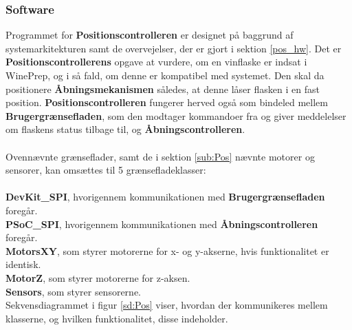\subsubsection{Software}
Programmet for \textbf{Positionscontrolleren} er designet på baggrund af systemarkitekturen samt de overvejelser, der er gjort i sektion \ref{pos_hw}. Det er \textbf{Positionscontrollerens} opgave at vurdere, om en vinflaske er indsat i WinePrep, og i så fald, om denne er kompatibel med systemet. Den skal da positionere \textbf{Åbningsmekanismen} således, at denne låser flasken i en fast position. \textbf{Positionscontrolleren} fungerer herved også som bindeled mellem \textbf{Brugergrænsefladen}, som den modtager kommandoer fra og giver meddelelser om flaskens status tilbage til, og \textbf{Åbningscontrolleren}. \\
\\
Ovennævnte grænseflader, samt de i sektion \ref{sub:Pos} nævnte motorer og sensorer, kan omsættes til 5 grænsefladeklasser: \\
\\
\textbf{DevKit\_SPI}, hvorigennem kommunikationen med \textbf{Brugergrænsefladen} foregår. \\
\textbf{PSoC\_SPI}, hvorigennem kommunikationen med \textbf{Åbningscontrolleren} foregår. \\
\textbf{MotorsXY}, som styrer motorerne for x- og y-akserne, hvis funktionalitet er identisk. \\
\textbf{MotorZ}, som styrer motorerne for z-aksen. \\
\textbf{Sensors}, som styrer sensorerne. \\

Sekvensdiagrammet i figur \ref{sd:Pos} viser, hvordan der kommunikeres mellem klasserne, og hvilken funktionalitet, disse indeholder.

